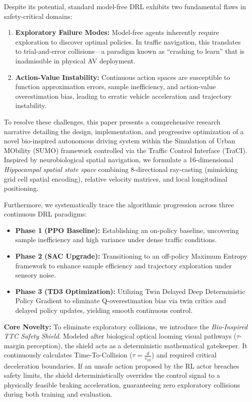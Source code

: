 \documentclass{svproc}
\begin{document}
Despite its potential, standard model-free DRL exhibits two fundamental flaws in safety-critical domains:
\begin{enumerate}
    \item \textbf{Exploratory Failure Modes:} Model-free agents inherently require exploration to discover optimal policies. In traffic navigation, this translates to trial-and-error collisions---a paradigm known as ``crashing to learn'' that is inadmissible in physical AV deployment.
    \item \textbf{Action-Value Instability:} Continuous action spaces are susceptible to function approximation errors, sample inefficiency, and action-value overestimation bias, leading to erratic vehicle acceleration and trajectory instability.
\end{enumerate}

To resolve these challenges, this paper presents a comprehensive research narrative detailing the design, implementation, and progressive optimization of a novel bio-inspired autonomous driving system within the Simulation of Urban MObility (SUMO) framework controlled via the Traffic Control Interface (TraCI). Inspired by neurobiological spatial navigation, we formulate a 16-dimensional \textit{Hippocampal spatial state space} combining 8-directional ray-casting (mimicking grid cell spatial encoding), relative velocity matrices, and local longitudinal positioning.

Furthermore, we systematically trace the algorithmic progression across three continuous DRL paradigms:
\begin{itemize}
    \item \textbf{Phase 1 (PPO Baseline):} Establishing an on-policy baseline, uncovering sample inefficiency and high variance under dense traffic conditions.
    \item \textbf{Phase 2 (SAC Upgrade):} Transitioning to an off-policy Maximum Entropy framework to enhance sample efficiency and trajectory exploration under sensory noise.
    \item \textbf{Phase 3 (TD3 Optimization):} Utilizing Twin Delayed Deep Deterministic Policy Gradient to eliminate Q-overestimation bias via twin critics and delayed policy updates, yielding smooth continuous control.
\end{itemize}

\textbf{Core Novelty:} To eliminate exploratory collisions, we introduce the \textit{Bio-Inspired TTC Safety Shield}. Modeled after biological optical looming visual pathways ($\tau$-margin perception), the shield acts as a deterministic mathematical gatekeeper. It continuously calculates Time-To-Collision ($\tau = \frac{d}{v_{\text{rel}}}$) and required critical deceleration boundaries. If an unsafe action proposed by the RL actor breaches safety limits, the shield deterministically overrides the control signal to a physically feasible braking acceleration, guaranteeing zero exploratory collisions during both training and evaluation.
\end{document}
